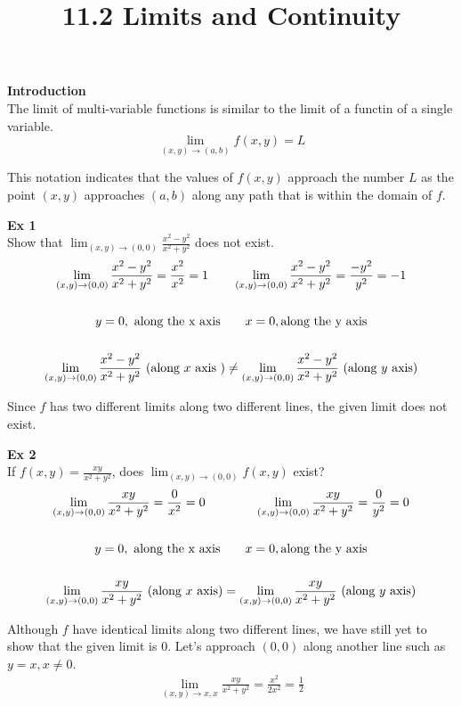 \documentclass{article}
\title{11.2 Limits and Continuity}
\begin{document}
  \maketitle
  \textbf{Introduction}\\
  The limit of multi-variable functions is similar to the limit of a functin of a single variable.
  \[
    \lim_{(x,y)\to(a,b)}f(x,y)=L 
  \]

  This notation indicates that the values of $ f(x,y) $ approach the number $ L $ as the point $ (x,y) $ approaches $ (a,b) $ along any path that is within the domain of $ f $.
  
 \textbf{Ex 1}\\
 Show that $ \lim_{(x,y)\to(0,0)}\frac{x^{2}-y^{2}}{x^{2}+y^{2}}$ does not exist.
 \[
   \begin{gathered}
   \lim_{(x,y) \to (0,0)} \frac{x^{2}-y^{2}}{x^{2}+y^{2}}=\frac{x^{2}}{x^{2}}=1 \qquad \lim_{(x,y) \to (0,0)} \frac{x^{2}-y^{2}}{x^{2}+y^{2}}=\frac{-y^{2}}{y^{2}}=-1\\
   ~\\
   y=0,\text{ along the x axis} \qquad x=0, \text{along the y axis}\\
   ~\\
   \lim_{(x,y)\to(0,0)} \frac{x^{2}-y^{2}}{x^{2}+y^{2}} \text{ (along $ x $ axis )} \neq \lim_{(x,y)\to(0,0)} \frac{x^{2}-y^{2}}{x^{2}+y^{2}} \text{ (along $ y $ axis)}   
   \end{gathered}
 \]

 Since $ f $ has two different limits along two different lines, the given limit does not exist.

 \textbf{Ex 2}\\
 If $ f(x,y)  = \frac{xy}{x^{2}+y^{2}  }$, does $ \lim_{(x,y)\to(0,0)} f(x,y) $ exist?
 \[
   \begin{gathered}
   \lim_{(x,y)\to (0,0)} \frac{xy}{x^{2}+y^{2}}=\frac{0}{x^{2}} = 0 \qquad \qquad \lim_{(x,y)\to (0,0)} \frac{xy}{x^{2}+y^{2}}=\frac{0}{y^{2} }=0\\
   ~\\
   y=0,\text{ along the x axis} \qquad x=0, \text{along the y axis}\\
   ~\\
   \lim_{(x,y)\to (0,0)} \frac{xy}{x^{2}+y^{2}} \text{ (along $ x $ axis)} =  \lim_{(x,y)\to (0,0)} \frac{xy}{x^{2}+y^{2}} \text{ (along $ y $ axis)} 
   \end{gathered}
 \]

 Although $ f $ have identical limits along two different lines, we have still yet to show that the given limit is $ 0 $. Let's approach $ (0,0) $ along another line such as $ y=x, x\neq0 $.
 \[
   \begin{gathered}
   \lim_{(x,y)\to x,x} \frac{xy}{x^{2}+y^{2}} =\frac{x^{2}}{2x^{2}}=\frac{1}{2}\\
   \end{gathered}
 \]
\end{document}
